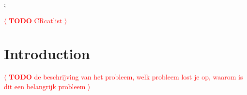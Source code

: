 \documentclass[review]{acmsiggraph}
\newcommand{\todo}[1]{\textcolor{red}{\(\langle\) \textbf{TODO} #1 \(\rangle\) }}
\begin{document}

\begin{CRcatlist}
  ;
\end{CRcatlist}
\todo{CRcatlist}


\keywordlist


\TOGlinkslist


\copyrightspace


\section{Introduction}
\todo{de beschrijving van het probleem, welk probleem lost je op,
waarom is dit een belangrijk probleem}
\end{document}
